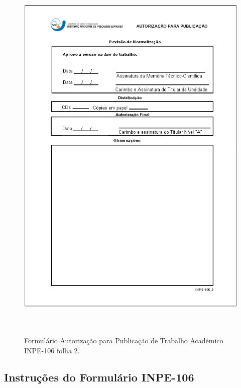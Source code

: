 \begin{figure}[h!]
	\caption{Formulário Autorização para Publicação de Trabalho Acadêmico INPE-106 folha 2.} 
	\vspace{6mm}	%
	\centering
	\includegraphics[height=18cm]{./docs/figs/form106folha2.png}
	\label{form106a}
\end{figure}

\clearpage
\subsection{Instruções do Formulário INPE-106} 
\label{instr106}


